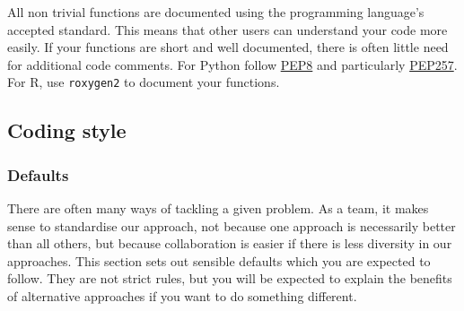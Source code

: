\documentclass[]{book}
\begin{document}
All non trivial functions are documented using the programming language's accepted standard.
This means that other users can understand your code more easily. If your functions are short and well documented, there is often little need for additional code comments.
For Python follow \href{https://www.python.org/dev/peps/pep-0008/}{PEP8} and particularly \href{https://www.python.org/dev/peps/pep-0257/}{PEP257}.
For R, use \texttt{roxygen2} to document your functions.

\hypertarget{coding-style}{%
\subsection{Coding style}\label{coding-style}}

\hypertarget{defaults}{%
\subsubsection{Defaults}\label{defaults}}

There are often many ways of tackling a given problem. As a team, it makes sense to standardise our approach, not because one approach is necessarily better than all others, but because collaboration is easier if there is less diversity in our approaches. This section sets out sensible defaults which you are expected to follow. They are not strict rules, but you will be expected to explain the benefits of alternative approaches if you want to do something different.
\end{document}
